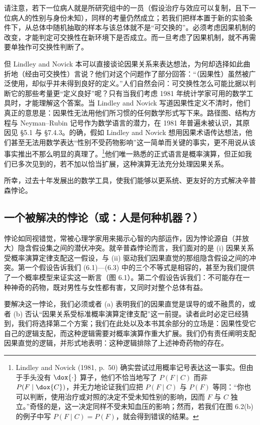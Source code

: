 请注意，若下一位病人就是所研究组中的一员（假设治疗与效应可以复制，且下一位病人的性别与身份未知），同样的考量仍然成立；若我们把样本置于新的实验条件下，从总体中随机抽取的样本与该总体就不是“可交换的”。必须考虑因果机制的改变，才能判定可交换性在新环境下是否成立。而一旦考虑了因果机制，就不再需要单独作可交换性判断了。

但 Lindley and Novick 本可以直接谈论因果关系来表达想法，为何却选择如此曲折地（经由可交换性）言说？他们对这个问题作了部分回答：“（因果性）虽然被广泛使用，却似乎并未得到良好的定义。”人们自然会问：可交换性怎么可能比据以判断它的那些考量更“定义良好”呢？只有当我们考虑 1981 年统计学家可用的数学工具时，才能理解这个答案。当 Lindley and Novick 写道因果性定义不清时，他们真正的意思是：因果性无法用他们所习惯的任何数学形式写下来。路径图、结构方程与 Neyman–Rubin 记号作为数学语言的潜力，在 1981 年普遍未被认识，其原因见 \S 5.1 与 \S 7.4.3。的确，假如 Lindley and Novick 想用因果术语传达想法，他们甚至无法用数学表达“性别不受药物影响”这一简单而关键的事实，更不用说从该事实推出不那么明显的真理了。\footnote{Lindley and Novick (1981, p.~50) 确实尝试过用概率记号表达这一事实。但由于手头没有 $\dox{\cdot}$ 算子，他们不恰当地写了 $P(F\mid C)$ 而非 $P(F\mid \dox{C})$，并无力地论证我们应把 $P(F\mid C)$ 与 $P(F)$ 等同：“你也可以判断，使用治疗或对照的决定不受未知性别的影响，因而 $F$ 与 $C$ 独立。”奇怪的是，这一决定同样不受未知血压的影响；然而，若我们在图 6.2(b) 的例子中写 $P(F\mid C)=P(F)$，就会得到错误的结果。}他们唯一熟悉的正式语言是概率演算，但正如我们已多次见到的，若不加以恰当扩展，这种演算无法充分处理因果关系。

所幸，过去十年发展出的数学工具，使我们能够以更系统、更友好的方式解决辛普森悖论。

\subsection{一个被解决的悖论（或：人是何种机器？）}

悖论如同视错觉，常被心理学家用来揭示心智的内部运作，因为悖论源自（并放大）隐含假设集之间的潜伏冲突。就辛普森悖论而言，我们面对的是 (i) 因果关系受概率演算定律支配这一假设，与 (ii) 驱动我们因果直觉的那组隐含假设之间的冲突。第一个假设告诉我们 \textup{(6.1)}—\textup{(6.3)} 中的三个不等式是相容的，甚至为我们提供了一个概率模型来证实这一断言（图 6.1）。第二个假设告诉我们：不可能存在一种神奇的药物，既对男性与女性都有害，又同时对整个总体有益。

要解决这一悖论，我们必须或者 (a) 表明我们的因果直觉是误导的或不融贯的，或者 (b) 否认“因果关系受标准概率演算定律支配”这一前提。读者此时必定已经猜到，我们将选择第二个方案；我们在此处以及本书其余部分的立场是：因果性受它自己的逻辑支配，而这种逻辑需要对概率演算作重大扩展。我们仍有责任阐明支配因果直觉的逻辑，并形式地表明：这种逻辑排除了上述神奇药物的存在。

